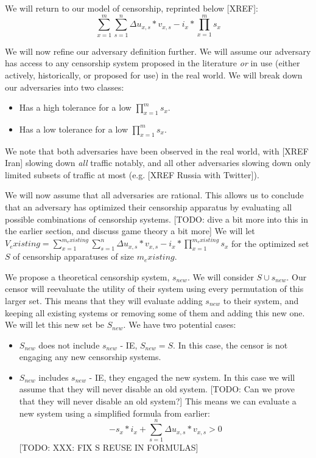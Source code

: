 \documentclass[12pt]{report}
\begin{document}
We will return to our model of censorship, reprinted below [XREF]:
\begin{equation}
\sum_{x=1}^{m}\sum_{s=1}^{n}\Delta u_{x,s}*v_{x,s} - i_{x} * \prod_{x=1}^{m}s_x
\end{equation}

We will now refine our adversary definition further. We will assume our adversary has access to any censorship system proposed in the literature \emph{or} in use (either actively, historically, or proposed for use) in the real world. We will break down our adversaries into two classes:
\begin{itemize}
  \item Has a high tolerance for a low $\prod_{x=1}^{m}s_x$.
  \item Has a low tolerance for a low $\prod_{x=1}^{m}s_x$.
\end{itemize}
We note that both adversaries have been observed in the real world, with [XREF Iran] slowing down \emph{all} traffic notably, and all other adversaries slowing down only limited subsets of traffic at most (e.g. [XREF Russia with Twitter]).

We will now assume that all adversaries are rational. This allows us to conclude that an adversary has optimized their censorship apparatus by evaluating all possible combinations of censorship systems. [TODO: dive a bit more into this in the earlier section, and discuss game theory a bit more] We will let $V_existing = \sum_{x=1}^{m_existing}\sum_{s=1}^{n}\Delta u_{x,s}*v_{x,s} - i_{x} * \prod_{x=1}^{m_existing}s_x$ for the optimized set $S$ of censorship apparatuses of size $m_existing$.

We propose a theoretical censorship system, $s_{new}$. We will consider $S \cup {s_{new}}$. Our censor will reevaluate the utility of their system using every permutation of this larger set. This means that they will evaluate adding $s_{new}$ to their system, and keeping all existing systems or removing some of them and adding this new one. We will let this new set be $S_{new}$. We have two potential cases:
\begin{itemize}
  \item $S_{new}$ does not include $s_{new}$ - IE, $S_{new} = S$. In this case, the censor is not engaging any new censorship systems.
  \item $S_{new}$ includes $s_{new}$ - IE, they engaged the new system. In this case we will assume that they will never disable an old system. [TODO: Can we prove that they will never disable an old system?] This means we can evaluate a new system using a simplified formula from earlier:
  \begin{equation}
-s_x*i_x + \sum_{s=1}^{n}\Delta u_{x,s}*v_{x,s} > 0
  \end{equation}
  [TODO: XXX: FIX S REUSE IN FORMULAS]
\end{itemize}
\end{document}
